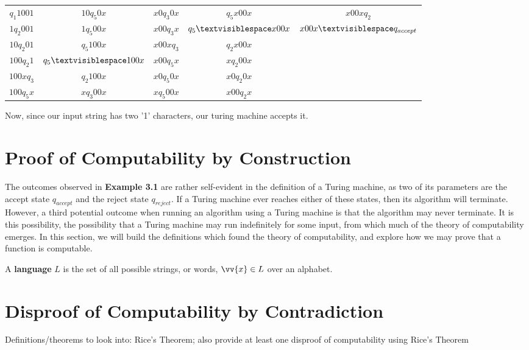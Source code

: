 \documentclass{article}
\begin{document}
\begin{exmp}
\begin{center}
\begin{tabular}{ c c c c c }
	$q_{1}1001$ & $10q_{5}0x$ & $x0q_{3}0x$ & $q_{5}x00x$ & $x00xq_{2}$ \\
	$1q_{2}001$ & $1q_{5}00x$ & $x00q_{3}x$ & $q_{5} \textvisiblespace x00x$ & $x00x \textvisiblespace q_{accept}$ \\
	$10q_{2}01$ & $q_{5}100x$ & $x00xq_{3}$ & $q_{2}x00x$\\
	$100q_{2}1$ & $q_{5} \textvisiblespace 100x$ & $x00q_{5}x$ & $xq_{2}00x$\\
	$100xq_{3}$ & $q_{2}100x$ & $x0q_{5}0x$ & $x0q_{2}0x$\\
	$100q_{5}x$ & $xq_{3}00x$ & $xq_{5}00x$ & $x00q_{2}x$
\end{tabular}
\end{center}
\end{exmp}
\noindent Now, since our input string has two '1' characters, our turing machine accepts it.

\section{Proof of Computability by Construction}
The outcomes observed in \textbf{Example 3.1} are rather self-evident in the definition of a Turing machine, as two of its parameters are the accept state $q_{accept}$ and the reject state $q_{reject}$.  If a Turing machine ever reaches either of these states, then its algorithm will terminate.  However, a third potential outcome when running an algorithm using a Turing machine is that the algorithm may never terminate.  It is this possibility, the possibility that a Turing machine may run indefinitely for some input, from which much of the theory of computability emerges.  In this section, we will build the definitions which found the theory of computability, and explore how we may prove that a function is computable.
\begin{defin}
	A \textbf{language} $L$ is the set of all possible strings, or words, $\vv{x} \in L$ over an alphabet.
\end{defin}

\section{Disproof of Computability by Contradiction}
Definitions/theorems to look into: Rice's Theorem; also provide at least one disproof of computability using Rice's Theorem
\end{document}
